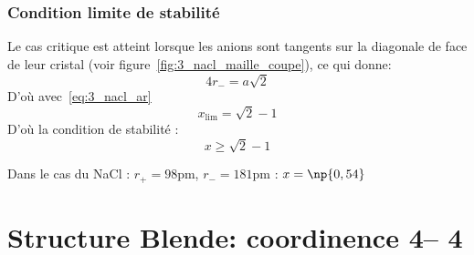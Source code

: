 \subsubsection{Condition limite de stabilité}
Le cas critique est atteint lorsque les anions sont tangents sur la diagonale de face
de leur cristal (voir figure~\ref{fig:3_nacl_maille_coupe}), ce qui donne:
\begin{equation}
    4r_- = a\sqrt{2}
    \label{eq:3_limite_ar-}
\end{equation}
D'où avec~\ref{eq:3_nacl_ar}
\begin{equation}
    x_\text{lim} = \sqrt{2} - 1
\end{equation}
D'où la condition de stabilité :
\begin{equation}
    \boxed{x \geq \sqrt{2} - 1}
    \label{eq:3_stab_x}
\end{equation}

Dans le cas du NaCl : $r_+ = 98$pm, $r_- = 181$pm : $x = \np{0,54}$



\section{Structure Blende: coordinence 4\--- 4}




























